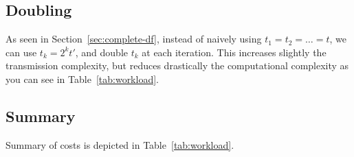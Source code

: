 \documentclass[11pt]{llncs}
\begin{document}
\subsection{Doubling}
\label{sec:doubling}

As seen in Section~\ref{sec:complete-df}, instead of naively using $t_1 = t_2 = \dots = t$, we can use $t_k = 2^k t'$, and double $t_k$ at each iteration.
This increases slightly the transmission complexity, but reduces drastically the computational complexity as you can see in Table~\ref{tab:workload}.

\subsection{Summary}

Summary of costs is depicted in Table~\ref{tab:workload}.
\end{document}
